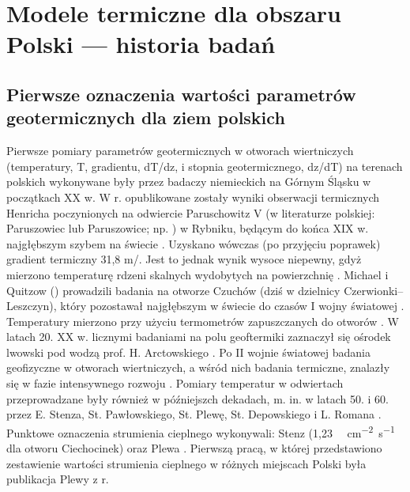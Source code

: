 \documentclass[11.5pt,twoside]{report}
\newcommand{\ct}[1]{\ignorespaces} %
\begin{document}

\chapter{Modele termiczne dla obszaru Polski --- historia badań}

\section{Pierwsze oznaczenia wartości parametrów geotermicznych dla ziem polskich}

Pierwsze pomiary parametrów geotermicznych w otworach wiertniczych (temperatury, T, gradientu, dT/dz, i stopnia geotermicznego, dz/dT) na terenach polskich wykonywane były przez badaczy niemieckich na Górnym Śląsku w początkach XX w. W \citeyear{Henrich.1904} r. opublikowane zostały wyniki obserwacji termicznych Henricha poczynionych na odwiercie Paruschowitz V (w literaturze polskiej: Paruszowiec lub Paruszowice; np. \cite{Plewa.1966,Stenz.1936}) w Rybniku, będącym do końca XIX w. najgłębszym szybem na świecie \parencite{Stenz.1936,Henrich.1904}. Uzyskano wówczas (po przyjęciu poprawek) gradient termiczny 31,8 m/{\textcelsius}. Jest to jednak wynik wysoce niepewny, gdyż mierzono temperaturę rdzeni skalnych wydobytych na powierzchnię \parencite{Maj.2010,Rudzki.1909,Henrich.1904}. Michael i Quitzow (\citeyear{Michael.1910}) prowadzili badania na otworze Czuchów (dziś w dzielnicy Czerwionki--Leszczyn), który pozostawał najgłębszym w świecie do czasów I wojny światowej \parencite{Stenz.1936}. Temperatury mierzono przy użyciu termometrów zapuszczanych do otworów \parencite{Michael.1910}. W latach 20. XX w. licznymi badaniami na polu geoftermiki zaznaczył się ośrodek lwowski pod wodzą prof. H. Arctowskiego \parencite{Plewa.1966,Maj.2010}. Po II wojnie światowej badania geofizyczne w otworach wiertniczych, a wśród nich badania termiczne, znalazły się w fazie intensywnego rozwoju \parencite{Plewa.1994}. Pomiary temperatur w odwiertach przeprowadzane były również w pó\'{z}niejszch dekadach, m. in. w latach 50. i 60. przez E. Stenza, St. Pawłowskiego, St. Plewę, St. Depowskiego i L. Romana \parencite{Plewa.1966,Roman.1962,Stenz.1936}. \ct{dopisac gdzie były badania} Punktowe oznaczenia strumienia cieplnego wykonywali: Stenz \ct{\citeyear{Stenz.1954}} (1,23 \si[sticky-per]{\micro\calorie.cm^{-2}.s^{-1}} dla otworu Ciechocinek) oraz Plewa \ct{parencite{Plewa.1961,Plewa.1963a,Plewa.1963b,Plewa.1965,Plewa.1966}}. Pierwszą pracą, w której przedstawiono zestawienie wartości strumienia cieplnego w różnych miejscach Polski była publikacja Plewy z \citeyear{Plewa.1966} r.
	
\end{document}
